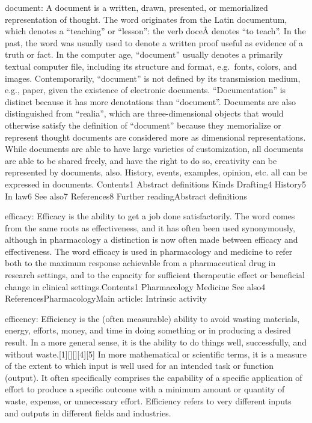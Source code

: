 \documentclass[]{book}
\begin{document}
document: A document is a written, drawn, presented, or memorialized
representation of thought. The word originates from the Latin
documentum, which denotes a ``teaching'' or ``lesson'': the verb doceÅ
denotes ``to teach''. In the past, the word was usually used to denote a
written proof useful as evidence of a truth or fact. In the computer
age, ``document'' usually denotes a primarily textual computer file,
including its structure and format, e.g.~fonts, colors, and images.
Contemporarily, ``document'' is not defined by its transmission medium,
e.g., paper, given the existence of electronic documents.
``Documentation'' is distinct because it has more denotations than
``document''. Documents are also distinguished from ``realia'', which
are three-dimensional objects that would otherwise satisfy the
definition of ``document'' because they memorialize or represent thought
documents are considered more as dimensional representations. While
documents are able to have large varieties of customization, all
documents are able to be shared freely, and have the right to do so,
creativity can be represented by documents, also. History, events,
examples, opinion, etc. all can be expressed in documents. Contents1
Abstract definitions Kinds Drafting4 History5 In law6 See also7
References8 Further readingAbstract definitions

efficacy: Efficacy is the ability to get a job done satisfactorily. The
word comes from the same roots as effectiveness, and it has often been
used synonymously, although in pharmacology a distinction is now often
made between efficacy and effectiveness. The word efficacy is used in
pharmacology and medicine to refer both to the maximum response
achievable from a pharmaceutical drug in research settings, and to the
capacity for sufficient therapeutic effect or beneficial change in
clinical settings.Contents1 Pharmacology Medicine See also4
ReferencesPharmacologyMain article: Intrinsic activity

efficency: Efficiency is the (often measurable) ability to avoid wasting
materials, energy, efforts, money, and time in doing something or in
producing a desired result. In a more general sense, it is the ability
to do things well, successfully, and without
waste.{[}1{]}{[}{]}{[}{]}{[}4{]}{[}5{]} In more mathematical or
scientific terms, it is a measure of the extent to which input is well
used for an intended task or function (output). It often specifically
comprises the capability of a specific application of effort to produce
a specific outcome with a minimum amount or quantity of waste, expense,
or unnecessary effort. Efficiency refers to very different inputs and
outputs in different fields and industries.
\end{document}

